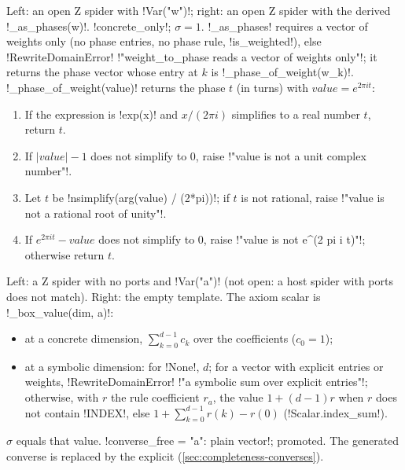 Left: an open Z spider with \py!Var("w")!; right: an open Z spider with the derived
\py!_as_phases(w)!. \py!concrete_only!; $\sigma=1$. \py!_as_phases! requires a vector of weights
only (no phase entries, no phase rule, \py!is_weighted!), else \py!RewriteDomainError!
\code!"weight_to_phase reads a vector of weights only"!; it returns the phase vector whose entry at
$k$ is \py!_phase_of_weight(w_k)!. \py!_phase_of_weight(value)! returns the phase $t$ (in turns)
with $\mathit{value}=e^{2\pi i t}$:
\begin{enumerate}
\item If the expression is \py!exp(x)! and $x/(2\pi i)$ simplifies to a real number $t$, return $t$.
\item If $|\mathit{value}|-1$ does not simplify to $0$, raise \code!"{value} is not a unit complex number"!.
\item Let $t$ be \py!nsimplify(arg(value) / (2*pi))!; if $t$ is not rational, raise
  \code!"{value} is not a rational root of unity"!.
\item If $e^{2\pi i t}-\mathit{value}$ does not simplify to $0$, raise
  \code!"{value} is not e^(2 pi i {t})"!; otherwise return $t$.
\end{enumerate}

Left: a Z spider with no ports and \py!Var("a")! (not open: a host spider with ports does not
match). Right: the empty template. The axiom scalar is \py!_box_value(dim, a)!:
\begin{itemize}
\item at a concrete dimension, $\sum_{k=0}^{d-1}c_k$ over the coefficients ($c_0=1$);
\item at a symbolic dimension: for \py!None!, $d$; for a vector with explicit entries or weights,
  \py!RewriteDomainError! \code!"a symbolic sum over explicit entries"!; otherwise, with $r$ the
  rule coefficient $r_{a}$, the value $1+(d-1)r$ when $r$ does not contain \py!INDEX!, else
  $1+\sum_{k=0}^{d-1}r(k)-r(0)$ (\py!Scalar.index_sum!).
\end{itemize}
$\sigma$ equals that value. \py!converse_free = {"a": plain vector}!; promoted. The generated
converse is replaced by the explicit 
(\cref{sec:completeness-converses}).

